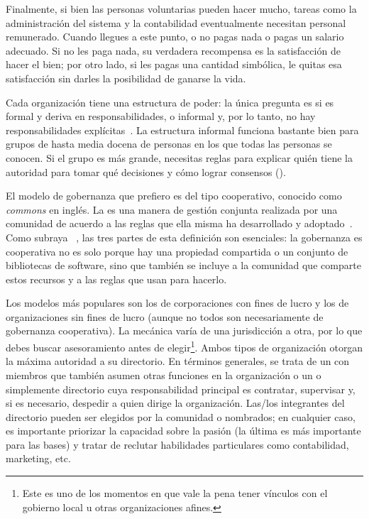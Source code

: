 Finalmente,
si bien  las personas voluntarias pueden hacer mucho,
tareas como la administración del sistema y la contabilidad eventualmente necesitan personal remunerado.
Cuando llegues a este punto, o no pagas nada o pagas un salario adecuado.
Si no les paga nada, su verdadera recompensa es la satisfacción de hacer el bien;
por otro lado, si les pagas una cantidad simbólica, le quitas esa satisfacción sin darles la posibilidad de ganarse la vida.


Cada organización tiene una estructura de poder:
la única pregunta es si es formal y deriva en responsabilidades, o informal y, por lo tanto, no hay responsabilidades explícitas~\cite{Free1972}.
La estructura informal funciona bastante bien para grupos de hasta media docena de personas
en los que todas las personas se conocen.
Si el grupo es más grande,
necesitas reglas para explicar
quién tiene la autoridad para tomar qué decisiones
y cómo lograr consensos ().

El modelo de gobernanza que prefiero es del tipo cooperativo, conocido como \emph{commons} en inglés. La  es una manera de gestión conjunta realizada por una comunidad
de acuerdo a las reglas que ella misma ha desarrollado y adoptado~\cite{Ostr2015}.
Como subraya ~\cite{Boll2014}, las tres partes de esta definición son esenciales:
la gobernanza es cooperativa no es solo porque hay una propiedad compartida o un conjunto de bibliotecas de software,
sino que también se incluye a la comunidad que comparte estos recursos y a las reglas que usan para hacerlo.

Los modelos más populares son los de corporaciones con fines de lucro y los de organizaciones sin fines de lucro (aunque no todos son necesariamente de gobernanza cooperativa).
La mecánica varía de una jurisdicción a otra,
por lo que debes buscar asesoramiento antes de elegir\footnote{
  Este es uno de los momentos
  en que vale la pena tener vínculos con el gobierno local u otras organizaciones afines.}.
Ambos tipos de organización otorgan la máxima autoridad a su directorio.
En términos generales, se trata de un 
con miembros que también asumen otras funciones en la organización
o un  o simplemente directorio cuya 
responsabilidad principal es contratar, supervisar
y, si es necesario, despedir a quien dirige la organización.
Las/los integrantes del directorio pueden ser elegidos por la comunidad o nombrados;
en cualquier caso, es importante priorizar la capacidad sobre la pasión
(la última es más importante para las bases)
y tratar de reclutar habilidades particulares como contabilidad, marketing, etc.

